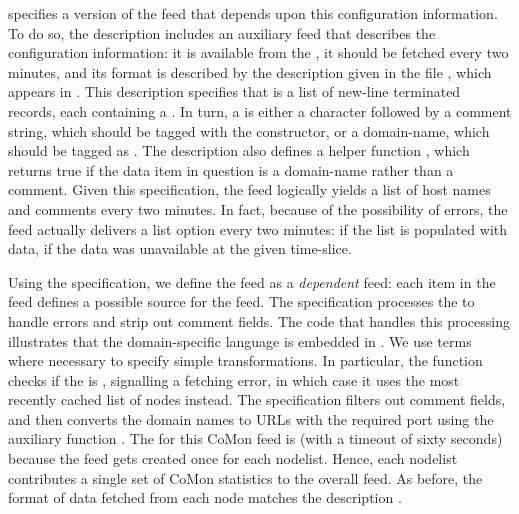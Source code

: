  specifies a version of the  feed that
depends upon this configuration information.  To do so, the
description includes an auxiliary feed  that describes the
configuration information: it is available from the
, it should be fetched every two minutes, and its
format is described by the \padsml{} description  given in
the file , which appears in .
This \padsml{} description specifies that  is a list of
new-line terminated records, each containing a .  In
turn, a  is either a  character followed by a
comment string, which should be tagged with the 
constructor, or a domain-name, which should be tagged as
. The description also defines a helper function ,
which returns true if the data item in question is a domain-name
rather than a comment.  Given this specification, the  feed
logically yields a list of host names and comments every two minutes.
In fact, because of the possibility of errors, the feed actually
delivers a list option every two minutes:  if the list is
populated with data,  if the data was unavailable at the
given time-slice.

Using the  specification, we define the  feed as a
\textit{dependent} feed: each item in the  feed defines a
possible source for the  feed.  The  
specification processes the  to handle errors and strip
out comment fields.  The code that handles this processing illustrates
that the \padsd{} domain-specific language is embedded in \ocaml{}.
We use \ocaml{} terms where necessary to specify simple
transformations.  In particular, the  function checks if
the  is , signalling a fetching error, in which
case it uses the most recently cached list of nodes instead.  The
 specification filters out comment fields, and then
converts the domain names to URLs with the required port using the
auxiliary function .  The  for this CoMon
feed is  (with a timeout of sixty seconds) because the feed
gets created once for each nodelist.  Hence, each nodelist contributes
a single set of CoMon statistics to the overall  feed. As
before, the format of data fetched from each node matches the
description .







